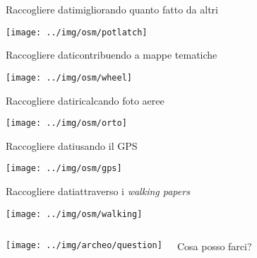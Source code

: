 \documentclass[xcolor=svgnames]{beamer}
\begin{document}

	\begin{frame}{Raccogliere dati}{migliorando quanto fatto da altri}
		\begin{center}
			\texttt{[image: ../img/osm/potlatch]}
		\end{center}
	\end{frame}


	\begin{frame}{Raccogliere dati}{contribuendo a mappe tematiche}
		\begin{center}
			\texttt{[image: ../img/osm/wheel]}
		\end{center}
	\end{frame}


	\begin{frame}{Raccogliere dati}{ricalcando foto aeree}
		\begin{center}
			\texttt{[image: ../img/osm/orto]}
		\end{center}
	\end{frame}


	\begin{frame}{Raccogliere dati}{usando il GPS}
		\begin{center}
			\texttt{[image: ../img/osm/gps]}
		\end{center}
	\end{frame}


	\begin{frame}{Raccogliere dati}{attraverso i \textit{walking papers}}
		\begin{center}
			\texttt{[image: ../img/osm/walking]}
		\end{center}
	\end{frame}


	\begin{frame}
		\begin{columns}[c]
				\begin{center}
					\texttt{[image: ../img/archeo/question]}
				\end{center}
				\huge Cosa posso farci?
		\end{columns}
	\end{frame}
\end{document}

